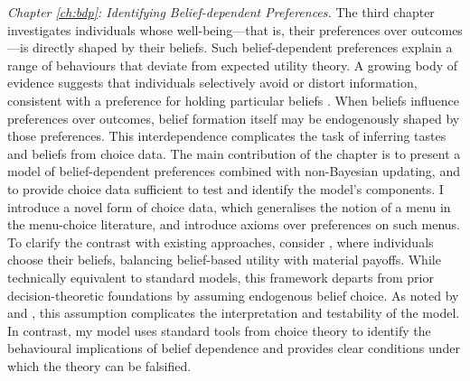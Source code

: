 \emph{Chapter \ref{ch:bdp}: Identifying Belief-dependent Preferences.} The third chapter investigates individuals whose well-being—that is, their preferences over outcomes—is directly shaped by their beliefs. Such belief-dependent preferences explain a range of behaviours that deviate from expected utility theory. A growing body of evidence suggests that individuals selectively avoid or distort information, consistent with a preference for holding particular beliefs \citep{golmanInformationAvoidance2017}. When beliefs influence preferences over outcomes, belief formation itself may be endogenously shaped by those preferences. This interdependence complicates the task of inferring tastes and beliefs from choice data. The main contribution of the chapter is to present a model of belief-dependent preferences combined with non-Bayesian updating, and to provide choice data sufficient to test and identify the model’s components. I introduce a novel form of choice data, which generalises the notion of a menu in the menu-choice literature, and introduce axioms over preferences on such menus. To clarify the contrast with existing approaches, consider \cite{brunnermeierOptimalExpectations2005}, where individuals choose their beliefs, balancing belief-based utility with material payoffs. While technically equivalent to standard models, this framework departs from prior decision-theoretic foundations by assuming endogenous belief choice. As noted by \cite{eliazCanAnticipatoryFeelings2006} and \cite{spieglerBehavioralEconomicsAtheoretical2019}, this assumption complicates the interpretation and testability of the model. In contrast, my model uses standard tools from choice theory to identify the behavioural implications of belief dependence and provides clear conditions under which the theory can be falsified.

